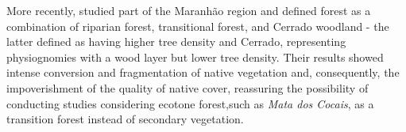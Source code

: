 












More recently, \citet{GARCIA201716} studied part of the Maranhão region and defined forest as a combination of riparian forest, transitional forest, and Cerrado woodland - the latter defined as having higher tree density and Cerrado, representing physiognomies with a wood layer but lower tree density. Their results showed intense conversion and fragmentation of native vegetation and, consequently, the impoverishment of the quality of native cover, reassuring the possibility of conducting studies considering ecotone forest,such as \textit{Mata dos Cocais}, as a transition forest instead of secondary vegetation.


